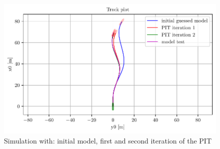 \begin{figure}[h]
    \centering
    \includegraphics[width=\textwidth]{kappa/images/0.pdf}
    \caption{Simulation with: initial model, first and second iteration of the PIT}
    \label{\detokenize{01.01_method:iterations}}
\end{figure}

